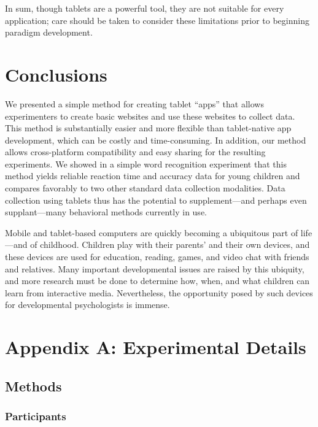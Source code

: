 \documentclass[man,noapacite]{apa2}
\begin{document}
In sum, though tablets are a powerful tool, they are not suitable for every application; care should be taken to consider these limitations prior to beginning paradigm development. 

\section{Conclusions} 

We presented a simple method for creating tablet ``apps'' that allows experimenters to create basic websites and use these websites to collect data. This method is substantially easier and more flexible than tablet-native app development, which can be costly and time-consuming. In addition, our method allows cross-platform compatibility and easy sharing for the resulting experiments. We showed in a simple word recognition experiment that this method yields reliable reaction time and accuracy data for young children and compares favorably to two other standard data collection modalities. Data collection using tablets thus has the potential to supplement---and perhaps even supplant---many behavioral methods currently in use. 

Mobile and tablet-based computers are quickly becoming a ubiquitous part of life---and of childhood. Children play with their parents' and their own devices, and these devices are used for education, reading, games, and video chat with friends and relatives. Many important developmental issues are raised by this ubiquity, and more research must be done to determine how, when, and what children can learn from interactive media. Nevertheless, the opportunity posed by such devices for developmental psychologists is immense.

\newpage




\newpage

\theappendix

\section{Appendix A: Experimental Details}

\subsection{Methods}

\subsubsection{Participants}                                                                                                                              
\end{document}
